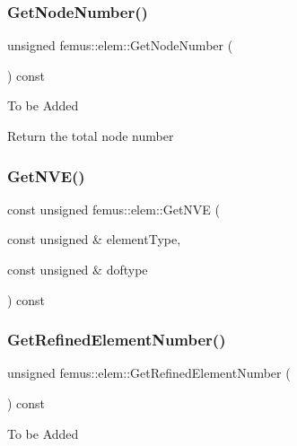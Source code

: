 \subsubsection{\texorpdfstring{Get\+Node\+Number()}{GetNodeNumber()}}
{\footnotesize\ttfamily unsigned femus\+::elem\+::\+Get\+Node\+Number (\begin{DoxyParamCaption}{ }\end{DoxyParamCaption}) const}

To be Added

Return the total node number \mbox{\label{classfemus_1_1elem_a6539367756eeeb85dbd4e9c5da24951b}} 
\subsubsection{\texorpdfstring{Get\+N\+V\+E()}{GetNVE()}}
{\footnotesize\ttfamily const unsigned femus\+::elem\+::\+Get\+N\+VE (\begin{DoxyParamCaption}\item[{const unsigned \&}]{element\+Type,  }\item[{const unsigned \&}]{doftype }\end{DoxyParamCaption}) const}

\mbox{\label{classfemus_1_1elem_a629acf1854d7c394ab093b02fe97351e}} 
\subsubsection{\texorpdfstring{Get\+Refined\+Element\+Number()}{GetRefinedElementNumber()}}
{\footnotesize\ttfamily unsigned femus\+::elem\+::\+Get\+Refined\+Element\+Number (\begin{DoxyParamCaption}{ }\end{DoxyParamCaption}) const\hspace{0.3cm}{\ttfamily [inline]}}

To be Added \mbox{\label{classfemus_1_1elem_ade1815f54f3b5786c58fb9c54574e21a}} 
